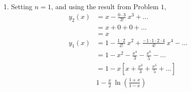 \begin{enumerate}
    \item Setting $ n=1 $, and using the result from Problem $ 1 $,
          \begin{align}
              y_2(x) & = x - \frac{0 \cdot 3}{3!}\ x^3 + \dots            \\
                     & = x + 0 + 0 + \dots                                \\
                     & = x                                                \\
              y_1(x) & = 1 - \frac{1 \cdot 2}{2!}\ x^2
              + \frac{-1 \cdot 1 \cdot 2 \cdot 4}{4!}\ x^4 - \dots        \\
                     & = 1 - x^2 - \frac{x^4}{3} - \frac{x^6}{5} - \dots  \\
                     & = 1 - x\left[ x + \frac{x^3}{3} + \frac{x^5}{5}
              + \dots \right]                                             \\
                     & 1 - \frac{x}{2}\ \ln\left( \frac{1+x}{1-x} \right) \\
          \end{align}


\end{enumerate}
